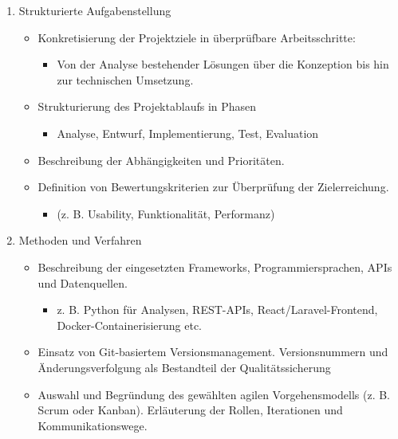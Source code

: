 \documentclass{article}
\begin{document}
\begin{enumerate}
\begin{itemize}
\begin{itemize}
\begin{itemize}
\begin{itemize}
        \item Marktdaten
        \item Nachrichtendienste
        \item Broker-APIs
        \end{itemize}
        \end{itemize}
        \end{itemize}
    \end{itemize}
    \item Strukturierte Aufgabenstellung
    \begin{itemize}
        \item Konkretisierung der Projektziele in überprüfbare Arbeitsschritte:
        \begin{itemize}
        \item Von der Analyse bestehender Lösungen über die Konzeption bis hin zur technischen Umsetzung.
        \end{itemize}
        \item  Strukturierung des Projektablaufs in Phasen 
               \begin{itemize}
        \item Analyse, Entwurf, Implementierung, Test, Evaluation
        \end{itemize}
        \item Beschreibung der Abhängigkeiten und Prioritäten.
        \item Definition von Bewertungskriterien  zur Überprüfung der Zielerreichung.  
                \begin{itemize}
        \item (z. B. Usability, Funktionalität, Performanz)
        \end{itemize}
    \end{itemize}
    \newpage
    \item Methoden und Verfahren
       \begin{itemize}
        \item Beschreibung der eingesetzten Frameworks, Programmiersprachen, APIs und Datenquellen. 
        \begin{itemize}
        \item  z. B. Python für Analysen, REST-APIs, React/Laravel-Frontend, Docker-Containerisierung etc.
        \end{itemize}
        \item Einsatz von Git-basiertem Versionsmanagement. Versionsnummern und Änderungsverfolgung als Bestandteil der Qualitätssicherung
         \item   Auswahl und Begründung des gewählten agilen Vorgehensmodells (z. B. Scrum oder Kanban). Erläuterung der Rollen, Iterationen und Kommunikationswege.

\end{itemize}
\end{enumerate}
\end{document}
